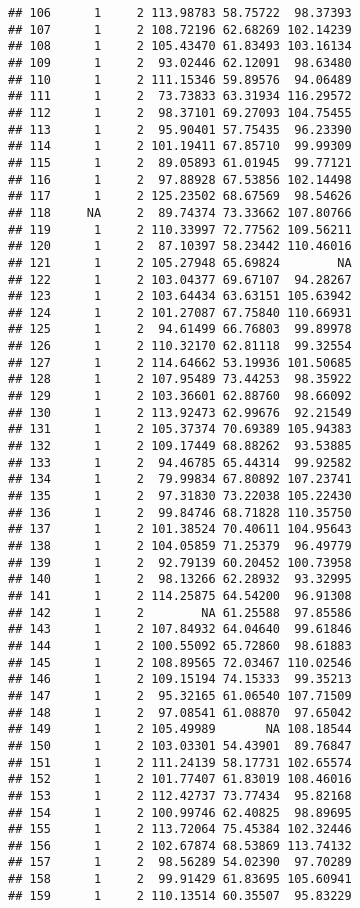 \documentclass[
]{article}
\begin{document}
\begin{verbatim}
## 106      1     2 113.98783 58.75722  98.37393
## 107      1     2 108.72196 62.68269 102.14239
## 108      1     2 105.43470 61.83493 103.16134
## 109      1     2  93.02446 62.12091  98.63480
## 110      1     2 111.15346 59.89576  94.06489
## 111      1     2  73.73833 63.31934 116.29572
## 112      1     2  98.37101 69.27093 104.75455
## 113      1     2  95.90401 57.75435  96.23390
## 114      1     2 101.19411 67.85710  99.99309
## 115      1     2  89.05893 61.01945  99.77121
## 116      1     2  97.88928 67.53856 102.14498
## 117      1     2 125.23502 68.67569  98.54626
## 118     NA     2  89.74374 73.33662 107.80766
## 119      1     2 110.33997 72.77562 109.56211
## 120      1     2  87.10397 58.23442 110.46016
## 121      1     2 105.27948 65.69824        NA
## 122      1     2 103.04377 69.67107  94.28267
## 123      1     2 103.64434 63.63151 105.63942
## 124      1     2 101.27087 67.75840 110.66931
## 125      1     2  94.61499 66.76803  99.89978
## 126      1     2 110.32170 62.81118  99.32554
## 127      1     2 114.64662 53.19936 101.50685
## 128      1     2 107.95489 73.44253  98.35922
## 129      1     2 103.36601 62.88760  98.66092
## 130      1     2 113.92473 62.99676  92.21549
## 131      1     2 105.37374 70.69389 105.94383
## 132      1     2 109.17449 68.88262  93.53885
## 133      1     2  94.46785 65.44314  99.92582
## 134      1     2  79.99834 67.80892 107.23741
## 135      1     2  97.31830 73.22038 105.22430
## 136      1     2  99.84746 68.71828 110.35750
## 137      1     2 101.38524 70.40611 104.95643
## 138      1     2 104.05859 71.25379  96.49779
## 139      1     2  92.79139 60.20452 100.73958
## 140      1     2  98.13266 62.28932  93.32995
## 141      1     2 114.25875 64.54200  96.91308
## 142      1     2        NA 61.25588  97.85586
## 143      1     2 107.84932 64.04640  99.61846
## 144      1     2 100.55092 65.72860  98.61883
## 145      1     2 108.89565 72.03467 110.02546
## 146      1     2 109.15194 74.15333  99.35213
## 147      1     2  95.32165 61.06540 107.71509
## 148      1     2  97.08541 61.08870  97.65042
## 149      1     2 105.49989       NA 108.18544
## 150      1     2 103.03301 54.43901  89.76847
## 151      1     2 111.24139 58.17731 102.65574
## 152      1     2 101.77407 61.83019 108.46016
## 153      1     2 112.42737 73.77434  95.82168
## 154      1     2 100.99746 62.40825  98.89695
## 155      1     2 113.72064 75.45384 102.32446
## 156      1     2 102.67874 68.53869 113.74132
## 157      1     2  98.56289 54.02390  97.70289
## 158      1     2  99.91429 61.83695 105.60941
## 159      1     2 110.13514 60.35507  95.83229

\end{verbatim}
\end{document}
